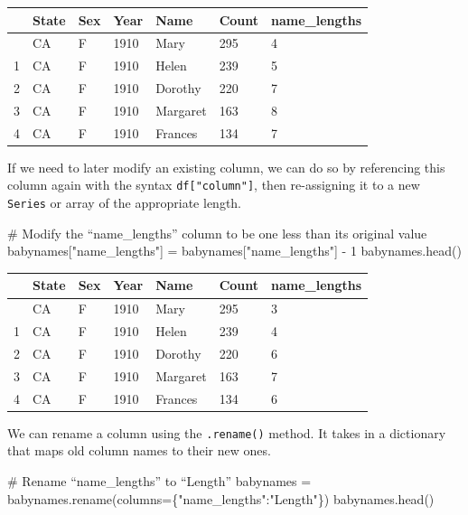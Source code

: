 \documentclass[
  letterpaper,
  DIV=11,
  numbers=noendperiod]{scrreprt}
\newenvironment{Shaded}{\begin{snugshade}}{\end{snugshade}}
\newcommand{\CommentTok}[1]{\textcolor[rgb]{0.37,0.37,0.37}{#1}}
\newcommand{\DecValTok}[1]{\textcolor[rgb]{0.68,0.00,0.00}{#1}}
\newcommand{\NormalTok}[1]{\textcolor[rgb]{0.00,0.23,0.31}{#1}}
\newcommand{\OperatorTok}[1]{\textcolor[rgb]{0.37,0.37,0.37}{#1}}
\newcommand{\StringTok}[1]{\textcolor[rgb]{0.13,0.47,0.30}{#1}}
\begin{document}
\begin{longtable}[]{@{}lllllll@{}}
\toprule\noalign{}
& State & Sex & Year & Name & Count & name\_lengths \\
\midrule\noalign{}
\endhead
\bottomrule\noalign{}
\endlastfoot
0 & CA & F & 1910 & Mary & 295 & 4 \\
1 & CA & F & 1910 & Helen & 239 & 5 \\
2 & CA & F & 1910 & Dorothy & 220 & 7 \\
3 & CA & F & 1910 & Margaret & 163 & 8 \\
4 & CA & F & 1910 & Frances & 134 & 7 \\
\end{longtable}

If we need to later modify an existing column, we can do so by
referencing this column again with the syntax \texttt{df{[}"column"{]}},
then re-assigning it to a new \texttt{Series} or array of the
appropriate length.

\begin{Shaded}
\begin{Highlighting}[]
\CommentTok{\# Modify the “name\_lengths” column to be one less than its original value}
\NormalTok{babynames[}\StringTok{"name\_lengths"}\NormalTok{] }\OperatorTok{=}\NormalTok{ babynames[}\StringTok{"name\_lengths"}\NormalTok{] }\OperatorTok{{-}} \DecValTok{1}
\NormalTok{babynames.head()}
\end{Highlighting}
\end{Shaded}

\begin{longtable}[]{@{}lllllll@{}}
\toprule\noalign{}
& State & Sex & Year & Name & Count & name\_lengths \\
\midrule\noalign{}
\endhead
\bottomrule\noalign{}
\endlastfoot
0 & CA & F & 1910 & Mary & 295 & 3 \\
1 & CA & F & 1910 & Helen & 239 & 4 \\
2 & CA & F & 1910 & Dorothy & 220 & 6 \\
3 & CA & F & 1910 & Margaret & 163 & 7 \\
4 & CA & F & 1910 & Frances & 134 & 6 \\
\end{longtable}

We can rename a column using the \texttt{.rename()} method. It takes in
a dictionary that maps old column names to their new ones.

\begin{Shaded}
\begin{Highlighting}[]
\CommentTok{\# Rename “name\_lengths” to “Length”}
\NormalTok{babynames }\OperatorTok{=}\NormalTok{ babynames.rename(columns}\OperatorTok{=}\NormalTok{\{}\StringTok{"name\_lengths"}\NormalTok{:}\StringTok{"Length"}\NormalTok{\})}
\NormalTok{babynames.head()}
\end{Highlighting}
\end{Shaded}
\end{document}
